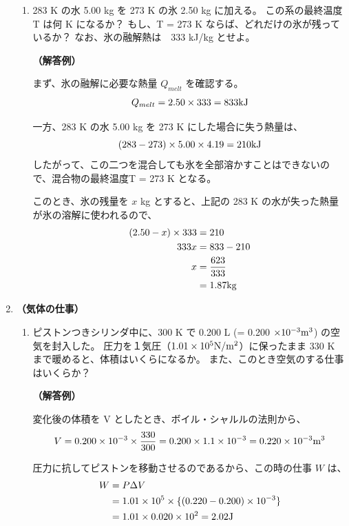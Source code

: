 \documentclass[uplatex,dvipdfmx,a4paper,11pt]{jsarticle}
\begin{document}
\begin{appendix}
\begin{enumerate}
\begin{enumerate}
\item
283 K の水 5.00 kg を 273 K の氷 2.50 kg に加える。
この系の最終温度 T は何 K になるか？
もし、T = 273 K ならば、どれだけの氷が残っているか？
なお、氷の融解熱は　333 kJ/kg とせよ。

{\bf （解答例）}

まず、氷の融解に必要な熱量 $Q_{melt}$ を確認する。
\begin{equation*}
Q_{melt} = 2.50 \times 333 = 833 {\rm kJ}
\end{equation*}

一方、283 K の水 5.00 kg を 273 K にした場合に失う熱量は、
\begin{equation*}
(283 - 273) \times 5.00 \times 4.19 = 210 {\rm kJ}
\end{equation*}
したがって、この二つを混合しても氷を全部溶かすことはできないので、混合物の最終温度T = 273 K となる。

このとき、氷の残量を $x$ kg とすると、上記の 283 K の水が失った熱量が氷の溶解に使われるので、
\begin{align*}
(2.50 - x) \times 333 &= 210 \\
333 x &= 833 - 210 \\
x &= \dfrac{623}{333} \\
	& = 1.87 {\rm kg}
\end{align*}

\end{enumerate}


\item 
{\bf （気体の仕事）}

\begin{enumerate}
\item
ピストンつきシリンダ中に、300 K で 0.200 L (= 0.200 $\times 10^{-3} {\rm m}^3$) の空気を封入した。
圧力を１気圧（$1.01 \times 10^5 {\rm N}/{\rm m}^2$）に保ったまま 330 K まで暖めると、体積はいくらになるか。
また、このとき空気のする仕事はいくらか？

{\bf （解答例）}

変化後の体積を V としたとき、ボイル・シャルルの法則から、
\begin{equation*}
V = 0.200 \times 10^{-3} \times \dfrac{330}{300} = 0.200 \times 1.1 \times 10^{-3} = 0.220 \times 10^{-3} {\rm m}^3
\end{equation*}


圧力に抗してピストンを移動させるのであるから、この時の仕事 $W$ は、
\begin{align*}
W &= P \Delta V \\
	&= 1.01 \times 10^5 \times \{ (0.220 - 0.200) \times 10^{-3} \} \\
	&= 1.01 \times 0.020 \times 10^{2} = 2.02 {\rm J}
\end{align*}


\end{enumerate}
\end{enumerate}
\end{appendix}
\end{document}

